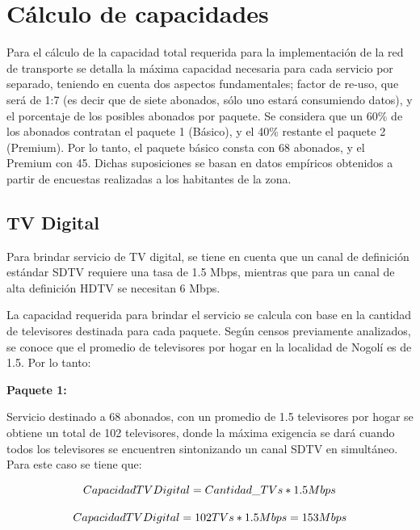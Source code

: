 \documentclass[12pt,a4paper]{book}
\begin{document}
\section{Cálculo de capacidades}

Para el cálculo de la capacidad total requerida para la implementación de la red de transporte se detalla la máxima capacidad necesaria para cada servicio por separado, teniendo en cuenta dos aspectos fundamentales; factor de re-uso, que será de 1:7 (es decir que de siete abonados, sólo uno estará consumiendo datos), y el porcentaje de los posibles abonados por paquete. 
Se considera que un 60\% de los abonados contratan el paquete 1 (Básico), y el 40\% restante el paquete 2 (Premium). Por lo tanto, el paquete básico consta con 68 abonados, y el Premium con 45. Dichas suposiciones se basan en datos empíricos obtenidos a partir de encuestas realizadas a los habitantes de la zona.



\subsection{TV Digital}

Para brindar servicio de TV digital, se tiene en cuenta que un canal de definición estándar SDTV requiere una tasa de 1.5 Mbps, mientras que para un canal de alta definición HDTV se necesitan 6 Mbps.

La capacidad requerida para brindar el servicio se calcula con base en la cantidad de televisores destinada para cada paquete. Según censos previamente analizados, se conoce que el promedio de televisores por hogar en la localidad de Nogolí es de 1.5. Por lo tanto:

\medskip

\noindent\textbf{Paquete 1:}

Servicio destinado a 68 abonados, con un promedio de 1.5 televisores por hogar se obtiene un total de 102 televisores, donde la máxima exigencia se dará cuando todos los televisores se encuentren sintonizando un canal SDTV en simultáneo. Para este caso se tiene que:

\begin{center}

\begin{equation}
Capacidad\-TV\-Digital = Cantidad\_TVs * 1.5 Mbps
\end{equation}

\begin{equation}
Capacidad\-TV\-Digital = 102 TVs * 1.5 Mbps = 153 Mbps
\end{equation}

\end{center}
\end{document}
